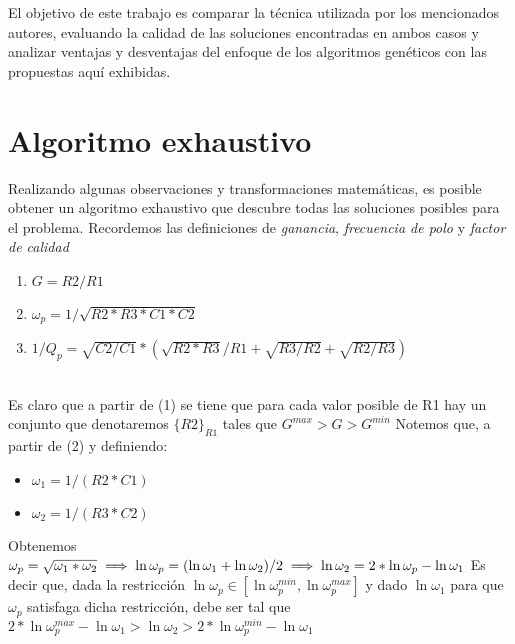 \documentclass{llncs}
\begin{document}
    El objetivo de este trabajo es comparar la t\'ecnica utilizada por los mencionados autores, evaluando la calidad
    de las soluciones encontradas en ambos casos y analizar ventajas y desventajas del enfoque de los algoritmos gen\'eticos
    con las propuestas aqu\'i exhibidas.
  
  \section{\textbf{Algoritmo exhaustivo}}
    Realizando algunas observaciones y transformaciones matem\'aticas, es posible obtener un algoritmo exhaustivo que descubre
    todas las soluciones posibles para el problema. Recordemos las definiciones de \textit{ganancia}, \textit{frecuencia de polo} y
    \textit{factor de calidad}
    
    \begin{enumerate}
      \item $G=R2/R1$
      \item $\omega_p = 1/\sqrt{R2*R3*C1*C2}$
      \item $1/Q_p = \sqrt{C2/C1} * (\sqrt{R2*R3}/R1 + \sqrt{R3/R2} + \sqrt{R2/R3})$
    \end{enumerate}
    ~\\\newline
    Es claro que a partir de (1) se tiene que para cada valor posible de R1 hay un conjunto que denotaremos 
    $\{R2\}_{R1}$ tales que $G^{max} > G > G^{min}$
    \newline \newline
    Notemos que, a partir de (2) y definiendo:
    \begin{itemize}[leftmargin=+.5in]
      \item $\omega_1 = 1/(R2*C1) $
      \item $\omega_2=1/(R3*C2)$
    \end{itemize}
    Obtenemos $\omega_p = \sqrt{\omega_1 * \omega_2} \implies \ln{\omega_p} = (\ln{\omega_1} + \ln{\omega_2})/2 \\ \implies
    \ln{\omega_2} = 2*\ln{\omega_p} - \ln{\omega_1} $\newline \newline
    Es decir que, dada la restricci\'on $\ln{\omega_p} \in [\ln{\omega_p^{min}},\ln{\omega_p^{max}}]$ y dado $\ln{\omega_1}$ para
    que $\omega_p$ satisfaga dicha restricci\'on, debe ser tal que 
    \newline \newline
    $2*\ln{\omega_p^{max}} - \ln{\omega_1} > \ln{\omega_2} > 2*\ln{\omega_p^{min}} - \ln{\omega_1} $ \newline \newline
\end{document}
